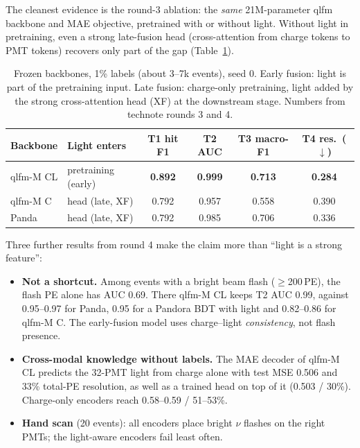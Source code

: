 \documentclass[11pt,a4paper]{article}
\begin{document}
The cleanest evidence is the round-3 ablation: the \emph{same} 21M-parameter qlfm backbone and MAE objective, pretrained with or without light. Without light in pretraining, even a strong late-fusion head (cross-attention from charge tokens to PMT tokens) recovers only part of the gap (Table~\ref{tab:claim}).

\begin{table}[H]\centering\small
\caption{Frozen backbones, 1\% labels (about 3--7k events), seed 0. Early fusion: light is part of the pretraining input. Late fusion: charge-only pretraining, light added by the strong cross-attention head (XF) at the downstream stage. Numbers from technote rounds 3 and 4.}\label{tab:claim}
\begin{tabular}{llcccc}\toprule
Backbone & Light enters & T1 hit F1 & T2 AUC & T3 macro-F1 & T4 res.\ ($\downarrow$)\\\midrule
qlfm-M CL & pretraining (early) & \textbf{0.892} & \textbf{0.999} & \textbf{0.713} & \textbf{0.284}\\
qlfm-M C  & head (late, XF) & 0.792 & 0.957 & 0.558 & 0.390\\
Panda & head (late, XF) & 0.792 & 0.985 & 0.706 & 0.336\\
\bottomrule\end{tabular}
\end{table}

Three further results from round 4 make the claim more than ``light is a strong feature'':
\begin{itemize}
  \item \textbf{Not a shortcut.} Among events with a bright beam flash ($\geq$200\,PE), the flash PE alone has AUC 0.69. There qlfm-M CL keeps T2 AUC 0.99, against 0.95--0.97 for Panda, 0.95 for a Pandora BDT with light and 0.82--0.86 for qlfm-M C. The early-fusion model uses charge--light \emph{consistency}, not flash presence.
  \item \textbf{Cross-modal knowledge without labels.} The MAE decoder of qlfm-M CL predicts the 32-PMT light from charge alone with test MSE 0.506 and 33\% total-PE resolution, as well as a trained head on top of it (0.503 / 30\%). Charge-only encoders reach 0.58--0.59 / 51--53\%.
  \item \textbf{Hand scan} (20 events): all encoders place bright $\nu$ flashes on the right PMTs; the light-aware encoders fail least often.
\end{itemize}
\end{document}
